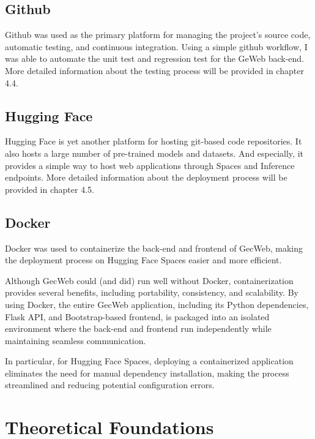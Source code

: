 \subsection{Github}
\label{github}

Github was used as the primary platform for managing the project's source code, automatic testing, and continuous integration.
Using a simple github workflow, I was able to automate the unit test and regression test for the GeWeb back-end.
More detailed information about the testing process will be provided in chapter 4.4.

\subsection{Hugging Face}
\label{hugging-face}

Hugging Face is yet another platform for hosting git-based code repositories.
It also hosts a large number of pre-trained models and datasets.
And especially, it provides a simple way to host web applications through Spaces and Inference endpoints.
More detailed information about the deployment process will be provided in chapter 4.5.

\subsection{Docker}
\label{docker}

Docker was used to containerize the back-end and frontend of GecWeb, making the deployment process on Hugging Face Spaces easier and more efficient.

Although GecWeb could (and did) run well without Docker, containerization provides several benefits, including portability, consistency, and scalability.
By using Docker, the entire GecWeb application, including its Python dependencies, Flask API, and Bootstrap-based frontend, is packaged into an isolated environment where the back-end and frontend run independently while maintaining seamless communication.

In particular, for Hugging Face Spaces, deploying a containerized application eliminates the need for manual dependency installation, making the process streamlined and reducing potential configuration errors.

\section{Theoretical Foundations}
\label{theoretical-foundations}

